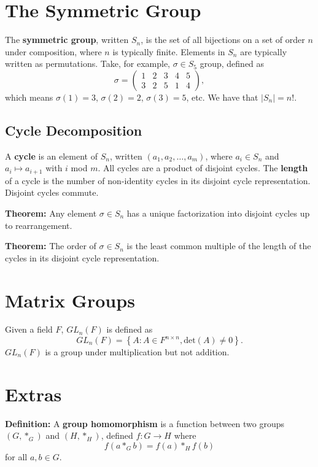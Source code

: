 \documentclass[12pt]{article}
\newcommand{\braceb}[1]{\left\{#1\right\}}
\newcommand{\vertb}[1]{\left\vert#1\right\vert}
\begin{document}
\pagestyle{fancy}

\setlength{\parindent}{0in}
\setlength{\parskip}{0.1in}

\section*{The Symmetric Group}

The \textbf{symmetric group}, written \( S_n \), is the set of
all bijections on a set of order \( n \) under composition, where \( n \) is
typically finite.
Elements in \( S_n \) are typically written as permutations.
Take, for example, \( \sigma \in S_5 \) group, defined as
\[
	\sigma = \begin{pmatrix}
		1 & 2 & 3 & 4 & 5 \\
		3 & 2 & 5 & 1 & 4
	\end{pmatrix},
\]
which means \( \sigma(1) = 3 \), \( \sigma(2) = 2 \), \( \sigma(3) = 5\), etc.
We have that \( \vertb{S_n} = n! \).

\subsection*{Cycle Decomposition}

A \textbf{cycle} is an element of \( S_n \), written
\( (a_1, a_2, \dots, a_m) \), where \( a_i \in S_n \) and
\( a_i \mapsto a_{i + 1} \) with \( i \) mod \( m \).
All cycles are a product of disjoint cycles.
The \textbf{length} of a cycle is the number of non-identity cycles in its
disjoint cycle representation.
Disjoint cycles commute.

\textbf{Theorem:} Any element \( \sigma \in S_n \) has a unique factorization
into disjoint cycles up to rearrangement.

\textbf{Theorem:} The order of \( \sigma \in S_n \) is the least common
multiple of the length of the cycles in its disjoint cycle representation.

\section*{Matrix Groups}

Given a field \( F \), \( GL_n(F) \) is defined as
\[
	GL_n(F) = \braceb{A : A \in F^{n \times n}, \text{det}(A) \ne 0 }.
\]
\( GL_n(F) \) is a group under multiplication but not addition.

\section*{Extras}

\textbf{Definition:} A \textbf{group homomorphism} is a function between
two groups \( (G, *_G) \) and \( (H, *_H) \), defined \( f : G \to H \) where
\[
	f(a *_G b) = f(a) *_H f(b)
\]
for all \( a, b \in G \).
\end{document}
